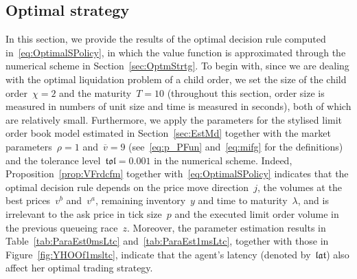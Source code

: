 \documentclass{amsart}[11pt]
\numberwithin{equation}{section}
\theoremstyle{definition}
\begin{document}
\subsection{Optimal strategy}\label{sec:OSresult}
In this section, we provide the results of the optimal decision rule computed in~\eqref{eq:OptimalSPolicy}, 
in which the value function is approximated through the numerical scheme in Section~\ref{sec:OptmStrtg}.
To begin with,
since we are dealing with the optimal liquidation problem of a child order, 
we set the size of the child order~$\chi = 2$ and the maturity~$T = 10$ 
(throughout this section, order size is measured in numbers of unit size and time is measured in seconds), 
both of which are relatively small.
Furthermore, we apply the parameters for the stylised limit order book model estimated in Section~\ref{sec:EstMd} together with the market parameters~$\rho = 1$ and~$\overline{v} = 9$ (see~\eqref{eq:p_PFun} and~\eqref{eq:mifg} for the definitions) and the tolerance level~$\mathfrak{tol}= 0.001$ in the numerical scheme.
Indeed, Proposition~\ref{prop:VFrdcfm} together with~\eqref{eq:OptimalSPolicy} indicates that the optimal decision rule depends on 
the price move direction~$j$, 
the volumes at the best prices~$v^b$ and~$v^a$, 
remaining inventory~$y$ 
and time to maturity~$\lambda$,
and is irrelevant to the ask price in tick size~$p$ and the executed limit order volume in the previous queueing race~$z$.
Moreover, the parameter estimation results in Table~\ref{tab:ParaEst0msLtc} and~\ref{tab:ParaEst1msLtc}, together with those in Figure~\ref{fig:YHOOf1msltc}, 
indicate that the agent's latency (denoted by~$\mathfrak{lat}$) also affect her optimal trading strategy.
\end{document}
